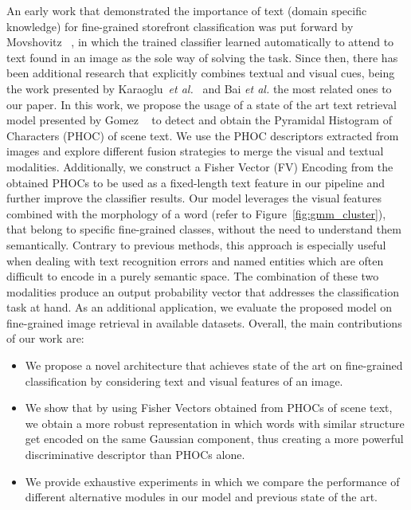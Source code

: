 \documentclass[10pt,twocolumn,letterpaper]{article}
\begin{document}
An early work that demonstrated the importance of text (domain specific knowledge) for fine-grained storefront classification was put forward by Movshovitz \etal~\cite{movshovitz2015ontological}, in which the trained classifier learned automatically to attend to text found in an image as the sole way of solving the task.
Since then, there has been additional research that explicitly combines textual and visual cues, being the work presented by Karaoglu~\textit{et al.}~\cite{karaoglu2013text, karaoglu2017words} and Bai \textit{et al.}\cite{bai2018integrating} the most related ones to our paper. 
In this work, we propose the usage of a state of the art text retrieval model presented by Gomez \etal~\cite{Gomez_2018_ECCV} to detect and obtain the Pyramidal Histogram of Characters (PHOC) of scene text. We use the PHOC descriptors extracted from images and explore different fusion strategies to merge the visual and textual modalities. Additionally, we construct a Fisher Vector (FV) Encoding from the obtained PHOCs to be used as a fixed-length text feature in our pipeline and further improve the classifier results. 
Our model leverages the visual features combined with the morphology of a word (refer to Figure~\ref{fig:gmm_cluster}), 
that belong to specific fine-grained classes, without the need to understand them semantically. Contrary to previous methods, this approach is especially useful when dealing with text recognition errors and named entities which are often difficult to encode in a purely semantic space. The combination of these two modalities produce an output probability vector that addresses the classification task at hand. As an additional application, we evaluate the proposed model on fine-grained image retrieval in available datasets.  
Overall, the main contributions of our work are:
\begin{itemize}[noitemsep,nolistsep]
\item We propose a novel architecture that achieves state of the art on fine-grained classification by considering text and visual features of an image.
\item We show that by using Fisher Vectors obtained from PHOCs of scene text, we obtain a more robust representation in which 
words with similar structure get encoded on the same Gaussian component, thus creating a more powerful discriminative descriptor than PHOCs alone.
\item We provide exhaustive experiments in which we compare the performance of different alternative modules in our model and previous state of the art.
\end{itemize}
\end{document}
